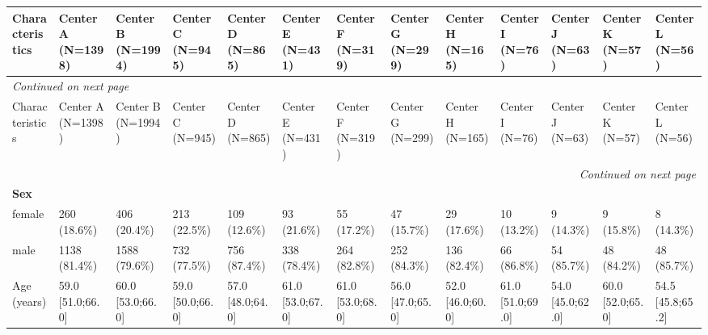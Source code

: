 \documentclass{article}
\begin{document}
\begin{landscape}
  \label{tab:external_multicenter_baseline}
\begin{tiny}
\setlength{\tabcolsep}{3pt}
\renewcommand{\arraystretch}{1.12}
\begin{tabularx}{\linewidth}{p{2.0cm}|X|X|X|X|X|X|X|X|X|X|X|X}
\toprule
Characteristics & Center A      (N=1398)      & Center B      (N=1994)      & Center C      (N=945)       & Center D      (N=865)       & Center E      (N=431)       & Center F      (N=319)       & Center G      (N=299)       & Center H      (N=165)       & Center I       (N=76)       & Center J       (N=63)       & Center K       (N=57)       & Center L       (N=56)       \\ \midrule
\midrule
\endfirsthead
\multicolumn{13}{l}{\small\emph{Continued on next page}} \\
\toprule
Characteristics & Center A      (N=1398)      & Center B      (N=1994)      & Center C      (N=945)       & Center D      (N=865)       & Center E      (N=431)       & Center F      (N=319)       & Center G      (N=299)       & Center H      (N=165)       & Center I       (N=76)       & Center J       (N=63)       & Center K       (N=57)       & Center L       (N=56)       \\ \midrule
\midrule
\endhead
\midrule \multicolumn{13}{r}{\small\emph{Continued on next page}} \\
\endfoot
\bottomrule
\endlastfoot
\rowcolor{gray!30}
\textbf{Sex}  &  &  &  &  &  &  &  &  &  &  &  &  \\
\rowcolor{gray!10}
    female &   260 (18.6\%)    &   406 (20.4\%)    &   213 (22.5\%)    &   109 (12.6\%)    &    93 (21.6\%)    &    55 (17.2\%)    &    47 (15.7\%)    &    29 (17.6\%)    &    10 (13.2\%)    &    9 (14.3\%)     &    9 (15.8\%)     &    8 (14.3\%)     \\
\rowcolor{gray!10}
    male &   1138 (81.4\%)   &   1588 (79.6\%)   &   732 (77.5\%)    &   756 (87.4\%)    &   338 (78.4\%)    &   264 (82.8\%)    &   252 (84.3\%)    &   136 (82.4\%)    &    66 (86.8\%)    &    54 (85.7\%)    &    48 (84.2\%)    &    48 (85.7\%)    \\
\rowcolor{gray!10}
Age (years) & 59.0 [51.0;66.0] & 60.0 [53.0;66.0] & 59.0 [50.0;66.0] & 57.0 [48.0;64.0] & 61.0 [53.0;67.0] & 61.0 [53.0;68.0] & 56.0 [47.0;65.0] & 52.0 [46.0;60.0] & 61.0 [51.0;69.0] & 54.0 [45.0;62.0] & 60.0 [52.0;65.0] & 54.5 [45.8;65.2] \\

\end{tabularx}
\end{tiny}
\end{landscape}
\end{document}
